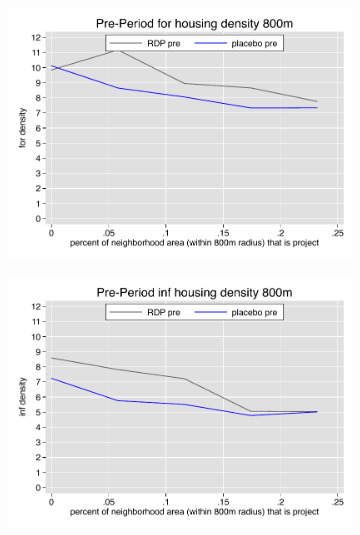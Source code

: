 \documentclass[12pt]{article}
\begin{document}
\pagebreak




\begin{figure}
        \begin{subfigure}[b]{0.495\textwidth}
            \centering
            \includegraphics[width=\textwidth,trim={0.3cm .3cm 0.1cm 0cm}, clip=true]{figures/overlap_for_800_total_pre.pdf}
        \end{subfigure}
        \hfill
        \begin{subfigure}[b]{0.495\textwidth}  
            \centering 
            \includegraphics[width=\textwidth,trim={0.3cm .3cm 0.1cm 0cm}, clip=true]{figures/overlap_inf_800_total_pre.pdf}
        \end{subfigure}

\end{figure}
\end{document}
